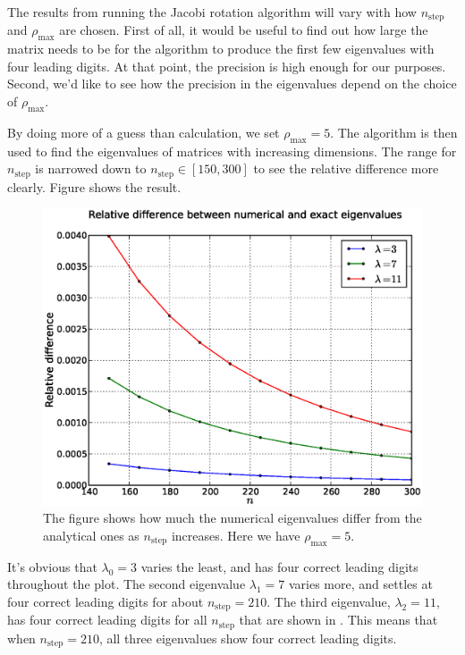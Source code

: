 The results from running the Jacobi rotation algorithm will vary with how 
$n_{\mathrm{step}}$ and $\rho_{\mathrm{max}}$ are chosen. First of all, it would be useful to find
out how large the matrix needs to be for the algorithm to produce the first few
eigenvalues with four leading digits. At that point, the precision is high
enough for our purposes. Second, we'd like to see how the precision in the
eigenvalues depend on the choice of $\rho_{\mathrm{max}}$. 

By doing more of a guess than calculation, we set $\rho_{\mathrm{max}} = 5$. The
algorithm is then used to find the eigenvalues of matrices with increasing
dimensions. The range for $n_{\mathrm{step}}$ is narrowed down to $n_{\mathrm{step}} \in 
[150,300]$ to see the relative difference more clearly. Figure  shows 
the result. 
%
\begin{figure}[htpb]
\centering
\includegraphics[width=1.0\textwidth]{images/nreldiff2.eps}
\caption{The figure shows how much the numerical eigenvalues differ from the analytical
	ones as $n_{\mathrm{step}}$ increases. Here we have $\rho_{\mathrm{max}} = 5$.}
\label{fig:nreldiff}
\end{figure}
%
It's obvious that $\lambda_0 = 3$ varies the least, and has four correct leading digits
throughout the plot. The second eigenvalue $\lambda_1 = 7$ varies more, and settles
at four correct leading digits for about $n_{\mathrm{step}} = 210$. The third eigenvalue,
$\lambda_2 = 11$, has four correct leading digits for all $n_{\mathrm{step}}$ that are shown in 
. This means that when $n_{\mathrm{step}} = 210$, all three eigenvalues show 
four correct leading digits. 

